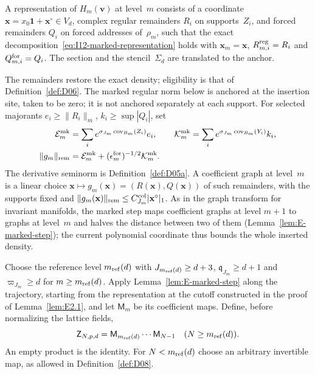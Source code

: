 \begin{definition}\label{def:D26}
A representation of $H_m(\mathbf v)$ at level~$m$ consists of a coordinate $\mathbf x=x_0\mathbf1+\mathbf x^\circ\in V_d$, complex regular remainders $R_i$ on supports~$Z_i$, and forced remainders $Q_i$ on forced addresses of~$\rho_m$, such that the exact decomposition~\eqref{eq:I12-marked-representation} holds with $\mathbf x_m=\mathbf x$, $R^{\rm reg}_{m,i}=R_i$ and $Q^{\rm for}_{m,i}=Q_i$. The section and the stencil~$\Sigma_d$ are translated to the anchor.
\end{definition}
The remainders restore the exact density; eligibility is that of Definition~\ref{def:D06}. The marked regular norm below is anchored at the insertion site, taken to be zero; it is not anchored separately at each support. For selected majorants $e_i\ge\|R_i\|_m$, $k_i\ge\sup|Q_i|$, set
\begin{equation}\label{eq:E-marked-mass}
\begin{aligned}
\mathcal E^{\rm mk}_m&=\sum_i e^{\sigma_{J_m}\operatorname{cov}_{B_m}(Z_i)}e_i,
\qquad \mathcal K^{\rm mk}_m=\sum_i e^{\sigma_{J_m}\operatorname{cov}_{B_m}(Y_i)}k_i,
\\
\|g_m\|_{\rm rem}&=\mathcal E^{\rm mk}_m+(\epsilon_m^{\rm for})^{-1/2}\mathcal K^{\rm mk}_m.
\end{aligned}
\end{equation}
The derivative seminorm is Definition~\ref{def:D05a}. A coefficient graph at level~$m$ is a linear choice $\mathbf x\mapsto g_m(\mathbf x)=(R(\mathbf x),Q(\mathbf x))$ of such remainders, with the supports fixed and $\|g_m(\mathbf x)\|_{\rm rem}\le C^{\rm col}_{J_m}|\mathbf x^\circ|_1$. As in the graph transform for invariant manifolds, the marked step maps coefficient graphs at level $m+1$ to graphs at level~$m$ and halves the distance between two of them (Lemma~\ref{lem:E-marked-step}); the current polynomial coordinate thus bounds the whole inserted density.



Choose the reference level $m_{\mathrm{ref}}(d)$ with $J_{m_{\mathrm{ref}}(d)}\ge d+3$, $\mathfrak q_{J_m}\ge d+1$ and $\varpi_{J_m}\ge d$ for $m\ge m_{\mathrm{ref}}(d)$. Apply Lemma~\ref{lem:E-marked-step} along the trajectory, starting from the representation at the cutoff constructed in the proof of Lemma~\ref{lem:E2.1}, and let $\mathsf M_m$ be its coefficient maps. Define, before normalizing the lattice fields,
\begin{equation}\label{eq:E-terminal-map}
 \mathsf Z_{N,p,d}=\mathsf M_{m_{\mathrm{ref}}(d)}\cdots\mathsf M_{N-1}\quad(N\ge m_{\mathrm{ref}}(d)).
\end{equation}
An empty product is the identity. For $N<m_{\mathrm{ref}}(d)$ choose an arbitrary invertible map, as allowed in Definition~\ref{def:D08}.

